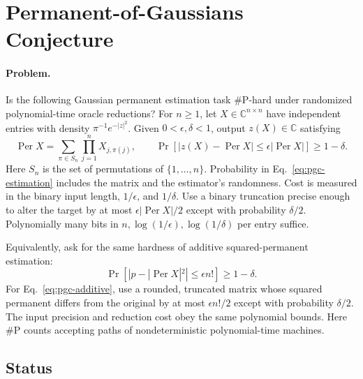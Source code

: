 \section{Permanent-of-Gaussians Conjecture}
\label{sec:op_af68b033a88ef934}

\paragraph{Problem.}
Is the following Gaussian permanent estimation task $\#\mathrm P$-hard under randomized polynomial-time oracle reductions?
For $n\geq1$, let $X\in\mathbb C^{n\times n}$ have independent entries with density $\pi^{-1}e^{-|z|^2}$.
Given $0<\epsilon,\delta<1$, output $z(X)\in\mathbb C$ satisfying
\begin{equation}
 \operatorname{Per}X=\sum_{\pi\in S_n}\prod_{j=1}^n X_{j,\pi(j)},
 \qquad
 \Pr[|z(X)-\operatorname{Per}X|\leq\epsilon|\operatorname{Per}X|]\geq1-\delta .
 \label{eq:pgc-estimation}
\end{equation}
Here $S_n$ is the set of permutations of $\{1,\ldots,n\}$.
Probability in Eq.~\eqref{eq:pgc-estimation} includes the matrix and the estimator's randomness.
Cost is measured in the binary input length, $1/\epsilon$, and $1/\delta$.
Use a binary truncation precise enough to alter the target by at most $\epsilon|\operatorname{Per}X|/2$ except with probability $\delta/2$.
Polynomially many bits in $n,\log(1/\epsilon),\log(1/\delta)$ per entry suffice.

Equivalently, ask for the same hardness of additive squared-permanent estimation:
\begin{equation}
 \Pr[|\widehat p-|\operatorname{Per}X|^2|\leq\epsilon n!]\geq1-\delta .
 \label{eq:pgc-additive}
\end{equation}
For Eq.~\eqref{eq:pgc-additive}, use a rounded, truncated matrix whose squared permanent differs from the original by at most $\epsilon n!/2$ except with probability $\delta/2$.
The input precision and reduction cost obey the same polynomial bounds.
Here $\#\mathrm P$ counts accepting paths of nondeterministic polynomial-time machines.

\subsection*{Status}

